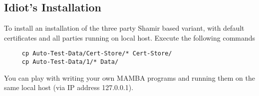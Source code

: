 \subsection{Idiot's Installation}
\label{sec:idiot}
To install an installation of the three party Shamir based
variant, with default certificates and all parties running
on local host.
Execute the following commands
\begin{verbatim}
     cp Auto-Test-Data/Cert-Store/* Cert-Store/
     cp Auto-Test-Data/1/* Data/
\end{verbatim}
You can play with writing your own MAMBA programs and
running them on the same local host (via IP address
127.0.0.1).

